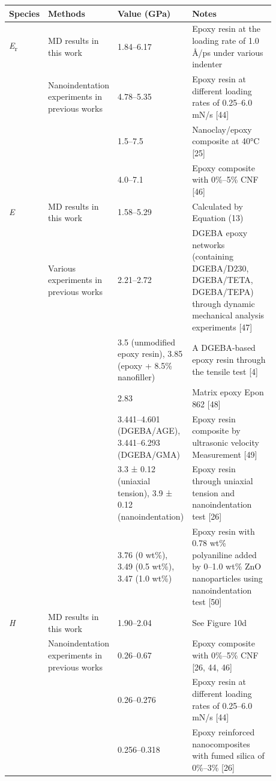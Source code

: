 \documentclass{article}
\begin{document}
\begin{center}\footnotesize
\begin{longtable}{p{0.06\linewidth}p{0.17\linewidth}p{0.29\linewidth}p{0.36\linewidth}}
\toprule
\textbf{Species} & \textbf{Methods} & \textbf{Value (GPa)} & \textbf{Notes} \\
\midrule
\emph{E}\textsubscript{r} & MD results in this work & 1.84–6.17 & Epoxy resin at the loading rate of 1.0 Å/ps under various indenter \\
 & Nanoindentation experiments in previous works & 4.78–5.35 & Epoxy resin at different loading rates of 0.25–6.0 mN/s [44] \\
 & & 1.5–7.5 & Nanoclay/epoxy composite at 40°C [25] \\
 & & 4.0–7.1 & Epoxy composite with 0\%–5\% CNF [46] \\
\emph{E} & MD results in this work & 1.58–5.29 & Calculated by Equation (13) \\
 & Various experiments in previous works & 2.21–2.72 & DGEBA epoxy networks (containing DGEBA/D230, DGEBA/TETA, DGEBA/TEPA) through dynamic mechanical analysis experiments [47] \\
 & & 3.5 (unmodified epoxy resin), 3.85 (epoxy + 8.5\% nanofiller) & A DGEBA-based epoxy resin through the tensile test [4] \\
 & & 2.83 & Matrix epoxy Epon 862 [48] \\
 & & 3.441–4.601 (DGEBA/AGE), 3.441–6.293 (DGEBA/GMA) & Epoxy resin composite by ultrasonic velocity Measurement [49] \\
 & & 3.3 ± 0.12 (uniaxial tension), 3.9 ± 0.12 (nanoindentation) & Epoxy resin through uniaxial tension and nanoindentation test [26] \\
 & & 3.76 (0 wt\%), 3.49 (0.5 wt\%), 3.47 (1.0 wt\%) & Epoxy resin with 0.78 wt\% polyaniline added by 0–1.0 wt\% ZnO nanoparticles using nanoindentation test [50] \\
\emph{H} & MD results in this work & 1.90–2.04 & See Figure 10d \\
 & Nanoindentation experiments in previous works & 0.26–0.67 & Epoxy composite with 0\%–5\% CNF [26, 44, 46] \\
 & & 0.26–0.276 & Epoxy resin at different loading rates of 0.25–6.0 mN/s [44] \\
 & & 0.256–0.318 & Epoxy reinforced nanocomposites with fumed silica of 0\%–3\% [26] \\
\bottomrule
\end{longtable}
\end{center}
\end{document}

